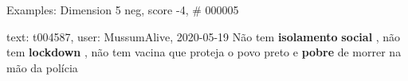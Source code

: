 \begin{frame}{Examples: Dimension 5 neg, score -4, \# 000005}
\footnotesize
\begin{alertblock}{text: t004587, user: MussumAlive, 2020-05-19}
Não tem \textbf{isolamento} \textbf{social} , não tem \textbf{lockdown} , não 
tem vacina que proteja o povo preto e \textbf{pobre} de morrer na mão da 
polícia 
\end{alertblock}
\end{frame}
